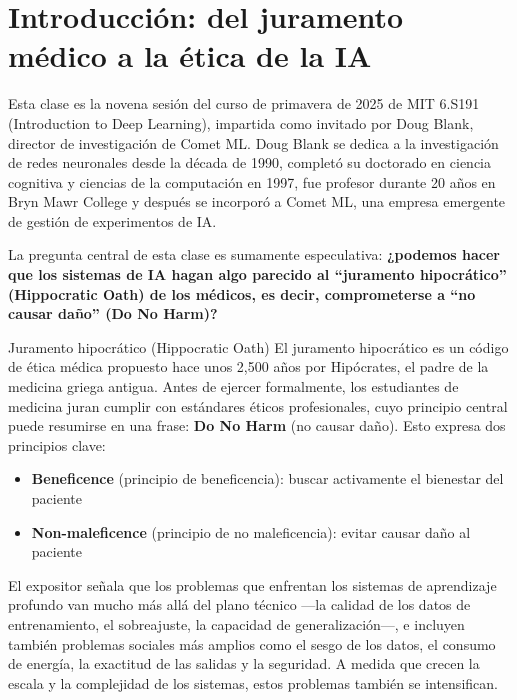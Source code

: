 \section{Introducción: del juramento médico a la ética de la IA}

Esta clase es la novena sesión del curso de primavera de 2025 de MIT 6.S191 (Introduction to Deep Learning), impartida como invitado por Doug Blank, director de investigación de Comet ML. Doug Blank se dedica a la investigación de redes neuronales desde la década de 1990, completó su doctorado en ciencia cognitiva y ciencias de la computación en 1997, fue profesor durante 20 años en Bryn Mawr College y después se incorporó a Comet ML, una empresa emergente de gestión de experimentos de IA.

La pregunta central de esta clase es sumamente especulativa: \textbf{¿podemos hacer que los sistemas de IA hagan algo parecido al ``juramento hipocrático'' (Hippocratic Oath) de los médicos, es decir, comprometerse a ``no causar daño'' (Do No Harm)?}

\begin{importantbox}{Juramento hipocrático (Hippocratic Oath)}
El juramento hipocrático es un código de ética médica propuesto hace unos 2,500 años por Hipócrates, el padre de la medicina griega antigua. Antes de ejercer formalmente, los estudiantes de medicina juran cumplir con estándares éticos profesionales, cuyo principio central puede resumirse en una frase: \textbf{Do No Harm} (no causar daño). Esto expresa dos principios clave:
\begin{itemize}
    \item \textbf{Beneficence} (principio de beneficencia): buscar activamente el bienestar del paciente
    \item \textbf{Non-maleficence} (principio de no maleficencia): evitar causar daño al paciente
\end{itemize}
\end{importantbox}

El expositor señala que los problemas que enfrentan los sistemas de aprendizaje profundo van mucho más allá del plano técnico —la calidad de los datos de entrenamiento, el sobreajuste, la capacidad de generalización—, e incluyen también problemas sociales más amplios como el sesgo de los datos, el consumo de energía, la exactitud de las salidas y la seguridad. A medida que crecen la escala y la complejidad de los sistemas, estos problemas también se intensifican.

